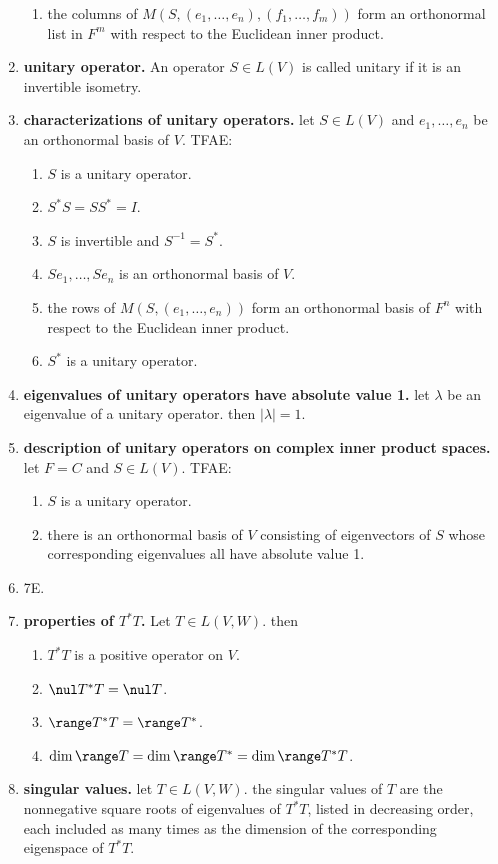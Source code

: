 \begin{enumerate}
\begin{enumerate}
		\item the columns of $M(S,(e_1,\dots,e_n), (f_1,\dots,f_m))$ form an orthonormal list in $F^m$ with respect to the Euclidean inner product. 
	\end{enumerate}
	\item \textbf{unitary operator. } An operator $S \in L(V)$ is called unitary if it is an invertible isometry. 
	\item \textbf{characterizations of unitary operators. } let $S \in L(V)$ and $e_1,\dots,e_n$ be an orthonormal basis of $V$. TFAE: 
	\begin{enumerate}
		\item $S$ is a unitary operator. 
		\item $S^*S = SS^* = I$. 
		\item $S$ is invertible and $S^{-1} = S^*$. 
		\item $Se_1,\dots,Se_n$ is an orthonormal basis of $V$. 
		\item the rows of $M(S,(e_1,\dots,e_n))$ form an orthonormal basis of $F^n$ with respect to the Euclidean inner product. 
		\item $S^*$ is a unitary operator. 
	\end{enumerate}
	\item \textbf{eigenvalues of unitary operators have absolute value 1. } let $\lambda$ be an eigenvalue of a unitary operator. then $|\lambda|=1$. 
	\item \textbf{description of unitary operators on complex inner product spaces. } let $F=C$ and $S \in L(V)$. TFAE: 
	\begin{enumerate}
		\item $S$ is a unitary operator. 
		\item there is an orthonormal basis of $V$ consisting of eigenvectors of $S$ whose corresponding eigenvalues all have absolute value 1. 
	\end{enumerate}
	\item 7E. 
	\item \textbf{properties of $T^*T$. } Let $T \in L(V,W)$. then 
	\begin{enumerate} 
		\item $T^*T$ is a positive operator on $V$. 
		\item $\nul T^*T = \nul T$. 
		\item $\range T^*T = \range T^*$. 
		\item $\dim\range T = \dim\range T^* = \dim\range T^*T$. 
	\end{enumerate}
	\item \textbf{singular values. } let $T \in L(V,W)$. the singular values of $T$ are the nonnegative square roots of eigenvalues of $T^*T$, listed in decreasing order, each included as many times as the dimension of the corresponding eigenspace of $T^*T$. 

\end{enumerate}
